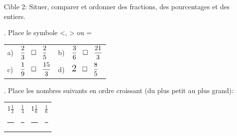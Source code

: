 \documentclass[11pt]{article}
\begin{document}
\begin{cible}{Cible 2: Situer, comparer et ordonner des fractions, des pourcentages et des entiers.}

  . Place le symbole <, > ou =

  \vspace{5mm}

  \begin{tabular}{@{}p{0.5cm}p{6cm}p{0.5cm}p{6cm}@{}}
    a) & \hspace{10mm}$\dfrac{2}{3}\hspace{3mm}\square\hspace{3mm} \dfrac{2}{5}$  & b) & \hspace{10mm}$\dfrac{3}{6}\hspace{3mm}\square\hspace{3mm} \dfrac{21}{3}$   \\[10mm]
    c) & \hspace{10mm}$\dfrac{1}{9}\hspace{3mm}\square\hspace{3mm} \dfrac{15}{3}$ & d) & \hspace{10mm}$\text{\Large 2}\hspace{3mm}\square\hspace{3mm} \dfrac{8}{5}$ \\[4mm]
  \end{tabular}

  \vspace{10mm}


  . Place les nombres  suivants en ordre croissant (du plus petit au plus grand):

  \vspace{5mm}

  \begin{center}
    \begin{tabular}{cccc}
      $1\frac{1}{2}$    & $\frac{1}{4}$     & $1\frac{1}{6}$    & $\frac{1}{6}$     \\
      [10mm]
      \rule{2cm}{0.4pt} & \rule{2cm}{0.4pt} & \rule{2cm}{0.4pt} & \rule{2cm}{0.4pt}
    \end{tabular}
  \end{center}
  \vspace{10mm}


\end{cible}

\newpage

\end{document}

